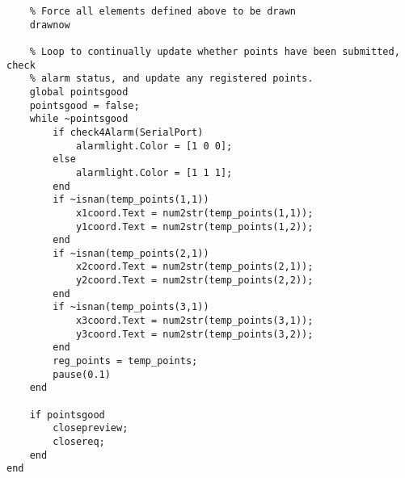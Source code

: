 \begin{lstlisting}
	% Force all elements defined above to be drawn
    drawnow
    
	% Loop to continually update whether points have been submitted, check
	% alarm status, and update any registered points.
    global pointsgood
    pointsgood = false;
    while ~pointsgood
        if check4Alarm(SerialPort)
            alarmlight.Color = [1 0 0];
        else
            alarmlight.Color = [1 1 1];
        end
        if ~isnan(temp_points(1,1))
            x1coord.Text = num2str(temp_points(1,1));
            y1coord.Text = num2str(temp_points(1,2));
        end
        if ~isnan(temp_points(2,1))
            x2coord.Text = num2str(temp_points(2,1));
            y2coord.Text = num2str(temp_points(2,2));
        end
        if ~isnan(temp_points(3,1))
            x3coord.Text = num2str(temp_points(3,1));
            y3coord.Text = num2str(temp_points(3,2));
        end
        reg_points = temp_points;
        pause(0.1)
    end
    
    if pointsgood
        closepreview;
        closereq;
    end
end

\end{lstlisting}
